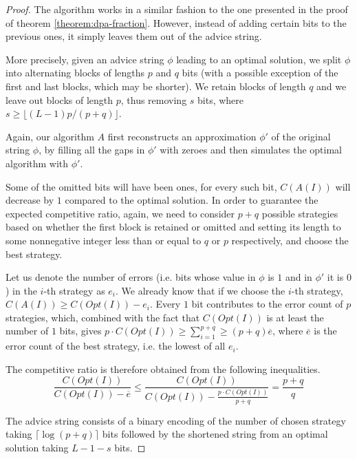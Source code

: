 \begin{proof}
    The algorithm works in a similar fashion to the one presented in the
    proof of theorem \ref{theorem:dpa-fraction}. However, instead of
    adding certain bits to the previous ones, it simply leaves them out of
    the advice string.

    More precisely, given an advice string $\phi$ leading to an optimal
    solution, we split $\phi$ into alternating blocks of lengths $p$ and
    $q$ bits (with a possible exception of the first and last blocks,
    which may be shorter). We retain blocks of length $q$ and we leave out
    blocks of length $p$, thus removing $s$ bits, where $s \geq
    \lfloor(L-1) p / (p+q)\rfloor$.

    Again, our algorithm $A$ first reconstructs an approximation
    $\phi'$ of the original string $\phi$, by filling all the gaps in
    $\phi'$ with zeroes and then simulates the optimal algorithm with
    $\phi'$.

    Some of the omitted bits will have been ones, for every such bit,
    $C(A(I))$ will decrease by $1$ compared to the optimal solution. In
    order to guarantee the expected competitive ratio, again, we need to
    consider $p+q$ possible strategies based on whether the first block is
    retained or omitted and setting its length to some nonnegative integer
    less than or equal to $q$ or $p$ respectively, and choose the best
    strategy.

    Let us denote the number of errors (i.e. bits whose value in $\phi$ is
    $1$ and in $\phi'$ it is $0$) in the $i$-th strategy as $e_i$. We
    already know that if we choose the $i$-th strategy, $C(A(I)) \geq
    C(Opt(I)) - e_i$. Every $1$ bit contributes to the error count of $p$
    strategies, which, combined with the fact that $C(Opt(I))$ is at least
    the number of $1$ bits, gives $p \cdot C(Opt(I)) \geq \sum_{i=1}^{p+q}
    \geq (p+q) \overline{e}$, where $\overline{e}$ is the error count of
    the best strategy, i.e. the lowest of all $e_i$.

    The competitive ratio is therefore obtained from the following
    inequalities.
    $$
        \frac{C(Opt(I))}{C(Opt(I))-\overline{e}} \leq
        \frac{C(Opt(I))}{C(Opt(I)) - \frac{p\cdot{}C(Opt(I))}{p+q}} =
        \frac{p+q}{q}
    $$

    The advice string consists of a binary encoding of the number of
    chosen strategy taking $\lceil\log(p+q)\rceil$ bits followed by the
    shortened string from an optimal solution taking $L - 1 - s$ bits.
\end{proof}

